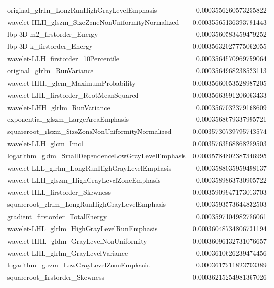 {\begin{xltabular}[H]{\textwidth}{X r}
        original\_glrlm\_LongRunHighGrayLevelEmphasis & 0.0003556260573255822 \\
        wavelet-HLH\_glszm\_SizeZoneNonUniformityNormalized & 0.00035565136393791443 \\
        lbp-3D-m2\_firstorder\_Energy & 0.0003560583459479252 \\
        lbp-3D-k\_firstorder\_Energy & 0.00035632027775062055 \\
        wavelet-LLH\_firstorder\_10Percentile & 0.0003564570969759064 \\
        original\_glrlm\_RunVariance & 0.0003564968238523113 \\
        wavelet-HHH\_glcm\_MaximumProbability & 0.00035660053528987205 \\
        wavelet-LHL\_firstorder\_RootMeanSquared & 0.00035663991206063433 \\
        wavelet-LHH\_glrlm\_RunVariance & 0.0003567032379168609 \\
        exponential\_glszm\_LargeAreaEmphasis & 0.0003568679337995721 \\
        squareroot\_glszm\_SizeZoneNonUniformityNormalized & 0.00035730739795743574 \\
        wavelet-LLH\_glcm\_Imc1 & 0.00035763568868289503 \\
        logarithm\_gldm\_SmallDependenceLowGrayLevelEmphasis & 0.00035784802387346995 \\
        wavelet-LLL\_glrlm\_LongRunHighGrayLevelEmphasis & 0.0003588035959498137 \\
        wavelet-LLH\_glszm\_HighGrayLevelZoneEmphasis & 0.0003589863730905722 \\
        wavelet-HLL\_firstorder\_Skewness & 0.00035909947173013703 \\
        squareroot\_glrlm\_LongRunHighGrayLevelEmphasis & 0.0003593573644832503 \\
        gradient\_firstorder\_TotalEnergy & 0.0003597104982786061 \\
        wavelet-LHL\_glrlm\_HighGrayLevelRunEmphasis & 0.00036048734806731194 \\
        wavelet-HHL\_gldm\_GrayLevelNonUniformity & 0.00036096132731076657 \\
        wavelet-LHL\_glrlm\_GrayLevelVariance & 0.0003610626239474456 \\
        logarithm\_glszm\_LowGrayLevelZoneEmphasis & 0.0003617211823703389 \\
        squareroot\_firstorder\_Skewness & 0.00036215254981367026 \\

\end{xltabular}}
